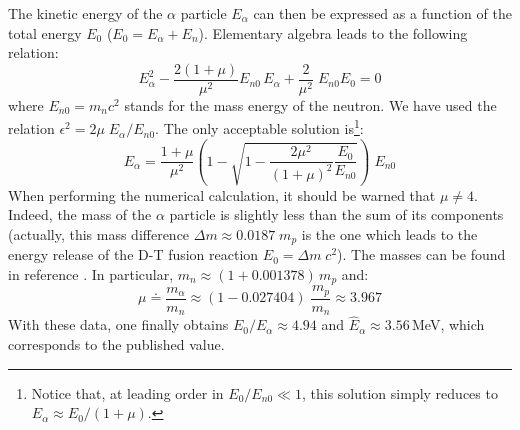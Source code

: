 The kinetic energy of the $\alpha$ particle $E_\alpha$ can then be expressed as a function of the total energy $E_0$ ($E_0 =E_\alpha + E_n$). Elementary algebra leads to the following relation:
\begin{equation}
    E_\alpha^2 - \frac{2(1+\mu)}{\mu^2}E_{n0}\, E_\alpha + \frac{2}{\mu^2}\; E_{n0}E_0 = 0
\end{equation}
where $E_{n0} = m_nc^2$ stands for the mass energy of the neutron. We have used the relation $\epsilon^2 = 2\mu\; E_\alpha/E_{n0}$. The only acceptable solution is\footnote{Notice that, at leading order in $E_0/E_{n0}\ll1$, this solution simply reduces to $E_\alpha \approx E_0/(1+\mu)$.}:
\begin{equation}
    E_\alpha = \frac{1+\mu}{\mu^2}
    \left( 1 - \sqrt{1-\frac{2\mu^2}{(1+\mu)^2}\frac{E_0}{E_{n0}}}\right)\; E_{n0}
\end{equation}
When performing the numerical calculation, it should be warned that $\mu\neq 4$. 
Indeed, the mass of the $\alpha$ particle is slightly less than the sum of its components (actually, this mass difference $\Delta m \approx 0.0187\; m_p$ is the one which leads to the energy release of the D-T fusion reaction $E_0 = \Delta m\;c^2$). The masses can be found in reference \cite{Wesson2004}. In particular, $m_n \approx (1+0.001378)\, m_p$ and:
$$
    \mu \doteq \frac{m_\alpha}{m_n} \approx (1-0.027404)\; \frac{m_p}{m_n} \approx 3.967
$$
With these data, one finally obtains $E_0/E_\alpha \approx 4.94$ and $\hat E_\alpha \approx 3.56\,$MeV, which corresponds to the published value.  
